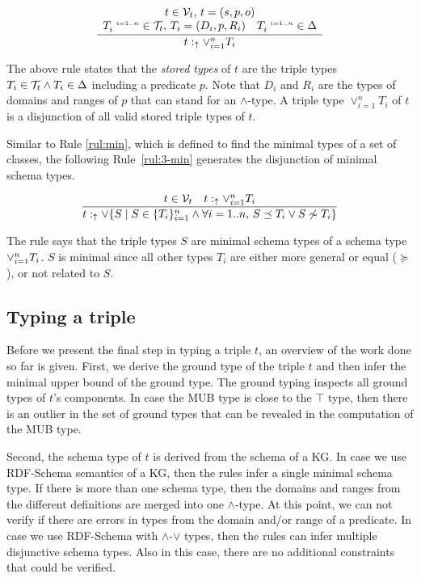 \documentclass[runningheads]{llncs}
\newcommand{\s}{\scriptscriptstyle\ \,}
\newcommand{\uarr}{\uparrow}
\newcommand{\DD}{{\Delta}}
\newcommand{\V}{{\cal V}}
\newcommand{\TT}{{\cal T}}
\begin{document}
\begin{equation}
\label{rul:3-stored2}
\dfrac{\begin{array}{c}
       t\in\V_t,\, t=(s,p,o) \\
       T_i^{\s\/i=1..n}\in\TT_t,\, T_i=(D_i,p,R_i)\quad\/T_i^{\s\/i=1..n}\in\Delta
       \end{array}}
       {t:_\uarr\/\lor_{i=1}^n\/T_i}
\end{equation}

The above rule states that the \emph{stored types} of $t$ are the
triple types $T_i\in\TT_t\land T_i\in\DD$ including a predicate
$p$. Note that $D_i$ and $R_i$ are the types of domains and ranges of
$p$ that can stand for an $\land$-type. A triple type
$\lor_{i=1}^nT_i$ of $t$ is a disjunction of all valid stored triple
types of $t$.

Similar to Rule \ref{rul:min}, which is defined to find the minimal
types of a set of classes, the following Rule~\ref{rul:3-min}
generates the disjunction of minimal schema types.

\begin{equation}
\label{rul:3-min}
\dfrac{t\in\V_t\quad\/t:_\uarr\lor_{i=1}^n\/T_i}
      {t:_{\uarr}\lor\{S \mid S\in\/\{T_i\}_{i=1}^n\land\forall\/i=1..n,\, S\preceq\/T_i\lor\/S\not\sim\/T_i\}}
\end{equation}

The rule says that the triple types $S$ are minimal schema types of a
schema type $\lor_{i=1}^n\/T_i$. $S$ is minimal since all other
types $T_i$ are either more general or equal ($\succeq$), or not
related to $S$. 





\subsection{Typing a triple\label{sec:typing-3ples}}

Before we present the final step in typing a triple $t$, an overview
of the work done so far is given. First, we derive the ground type of
the triple $t$ and then infer the minimal upper bound of the ground
type. The ground typing inspects all ground types of $t$'s
components. In case the MUB type is close to the $\top$ type, then
there is an outlier in the set of ground types that can be revealed in
the computation of the MUB type.

Second, the schema type of $t$ is derived from the schema of a KG. In
case we use RDF-Schema semantics of a KG, then the rules infer a
single minimal schema type. If there is more than one schema type,
then the domains and ranges from the different definitions are merged
into one $\land$-type. At this point, we can not verify if there are
errors in types from the domain and/or range of a predicate. In
case we use RDF-Schema with $\land$-$\lor$ types, then the rules can
infer multiple disjunctive schema types. Also in this case, there are
no additional constraints that could be verified.
\end{document}
